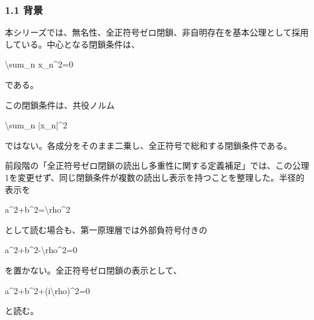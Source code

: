 \documentclass[
  a4paper,
]{article}
\newenvironment{Shaded}{}{}
\newcommand{\NormalTok}[1]{#1}
\begin{document}
\subsubsection{1.1 背景}\label{ux80ccux666f}

本シリーズでは、無名性、全正符号ゼロ閉鎖、非自明存在を基本公理として採用している。中心となる閉鎖条件は、

\begin{Shaded}
\begin{Highlighting}[]
\NormalTok{\textbackslash{}sum\_n x\_n\^{}2=0}
\end{Highlighting}
\end{Shaded}

である。

この閉鎖条件は、共役ノルム

\begin{Shaded}
\begin{Highlighting}[]
\NormalTok{\textbackslash{}sum\_n |x\_n|\^{}2}
\end{Highlighting}
\end{Shaded}

ではない。各成分をそのまま二乗し、全正符号で総和する閉鎖条件である。

前段階の「全正符号ゼロ閉鎖の読出し多重性に関する定義補足」では、この公理1を変更せず、同じ閉鎖条件が複数の読出し表示を持つことを整理した。半径的表示を

\begin{Shaded}
\begin{Highlighting}[]
\NormalTok{a\^{}2+b\^{}2=\textbackslash{}rho\^{}2}
\end{Highlighting}
\end{Shaded}

として読む場合も、第一原理層では外部負符号付きの

\begin{Shaded}
\begin{Highlighting}[]
\NormalTok{a\^{}2+b\^{}2{-}\textbackslash{}rho\^{}2=0}
\end{Highlighting}
\end{Shaded}

を置かない。全正符号ゼロ閉鎖の表示として、

\begin{Shaded}
\begin{Highlighting}[]
\NormalTok{a\^{}2+b\^{}2+(i\textbackslash{}rho)\^{}2=0}
\end{Highlighting}
\end{Shaded}

と読む。
\end{document}
